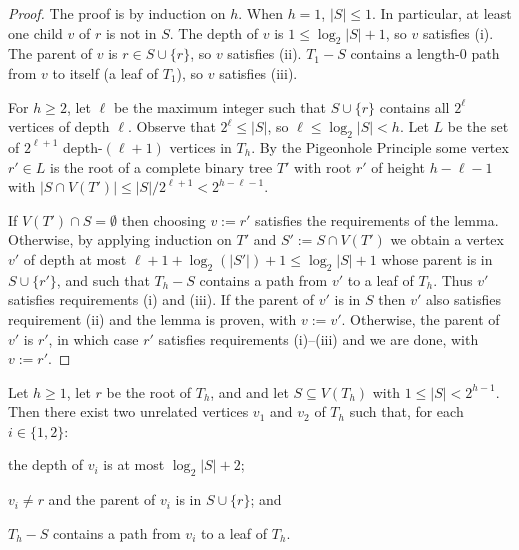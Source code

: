\documentclass{patmorin}
\renewcommand{\le}{\leqslant}
\renewcommand{\ge}{\geqslant}
\begin{document}
\begin{proof}
  The proof is by induction on $h$.  When $h=1$, $|S|\le 1$. In particular, at least one child $v$ of $r$ is not in $S$.  The depth of $v$ is $1\le \log_2|S|+1$, so $v$ satisfies (i).  The parent of $v$ is $r\in S\cup\{r\}$, so $v$ satisfies (ii).  $T_1-S$ contains a length-$0$ path from $v$ to itself (a leaf of $T_1$), so $v$ satisfies (iii).

  For $h\ge 2$, let $\ell$ be the maximum integer such that $S\cup\{r\}$ contains all $2^\ell$ vertices of depth $\ell$.  Observe that $2^\ell \le |S|$, so $\ell \le \log_2 |S| < h$.  Let $L$ be the set of $2^{\ell+1}$ depth-$(\ell+1)$ vertices in $T_h$.  By the Pigeonhole Principle some vertex $r'\in L$ is the root of a complete binary tree $T'$ with root $r'$ of height $h-\ell-1$ with $|S\cap V(T')| \le |S|/2^{\ell+1} < 2^{h-\ell-1}$.

  If $V(T')\cap S=\emptyset$ then choosing $v:=r'$ satisfies the requirements of the lemma.  Otherwise, by applying induction on $T'$ and $S':=S\cap V(T')$ we obtain a vertex $v'$ of depth at most $\ell+1+\log_2(|S'|)+1 \le \log_2|S|+1$ whose parent is in $S\cup\{r'\}$, and such that $T_h-S$ contains a path from $v'$ to a leaf of $T_h$.  Thus $v'$ satisfies requirements (i) and (iii).  If the parent of $v'$ is in $S$ then $v'$ also satisfies requirement (ii) and the lemma is proven, with $v:=v'$.  Otherwise, the parent of $v'$ is $r'$, in which case $r'$ satisfies requirements (i)--(iii) and we are done, with $v:=r'$.
\end{proof}

\begin{lem}\label{two_paths}
  Let $h\ge 1$, let $r$ be the root of $T_h$, and
  and let $S\subseteq V(T_h)$ with $1\le |S|< 2^{h-1}$. Then there exist two unrelated vertices $v_1$ and $v_2$ of $T_h$ such that, for each $i\in\{1,2\}$:
  \begin{compactenum}[(i)]
    \item the depth of $v_i$ is at most $\log_2|S|+2$;
    \item $v_i\neq r$ and the parent of $v_i$ is in $S\cup\{r\}$; and
    \item $T_h-S$ contains a path from $v_i$ to a leaf of $T_h$.
  \end{compactenum}
\end{lem}
\end{document}
